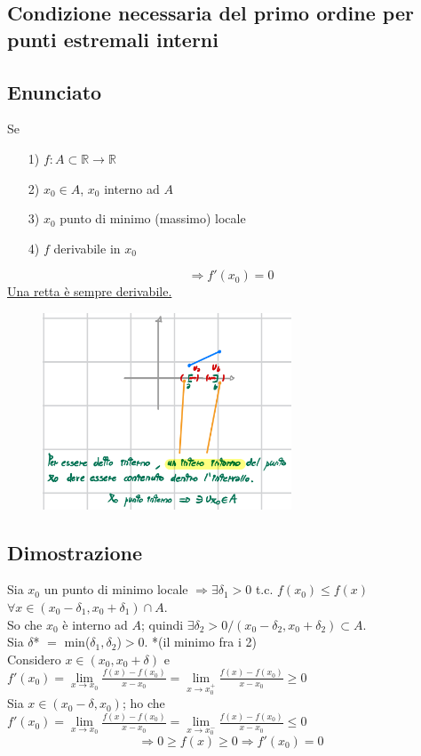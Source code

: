 \documentclass{article}
\newcommand{\R}{\mathbb{R}}
\newcommand{\hSpace}{\hspace{1em}}
\begin{document}
\begin{flushleft}
\section{Condizione necessaria del primo ordine per punti estremali interni}
\subsection{Enunciato}
Se
\begin{enumerate}
    \item[1)] $f: A \subset \R \rightarrow \R$
    \item[2)] $x_0 \in A$, $x_0$ interno ad $A$
    \item[3)] $x_0$ punto di minimo (massimo) locale
    \item[4)] $f$ derivabile in $x_0$   
\end{enumerate}
\[
\Rightarrow f'(x_0)=0
\]
\underline{Una retta è sempre derivabile.}
\begin{figure}[h]
    \centering
    \includegraphics[width=20em]{./images/condizione_necessaria_di_estremalita.jpeg}
\end{figure}
\FloatBarrier
\subsection{Dimostrazione}
Sia $x_0$ un punto di minimo locale $\Rightarrow \exists \delta_1 > 0$ t.c. $f(x_0) \leq f(x)$ $\forall x \in (x_0 - \delta_1, x_0 + \delta_1)\cap A$.\\
So che $x_0$ è interno ad $A$; quindi $\exists \delta_2 > 0 / (x_0 - \delta_2, x_0 + \delta_2) \subset A$.\\
Sia $\delta$* $=$ min($\delta_1, \delta_2$)$>0$. \hSpace *(il minimo fra i 2)\\
Considero $x \in (x_0, x_0 + \delta)$ e $f'(x_0) = \lim\limits_{x \to x_0}\frac{f(x) - f(x_0)}{x - x_0} = \lim\limits_{x \to x_0^+}\frac{f(x) - f(x_0)}{x - x_0} \geq 0$\\
Sia $x \in (x_0 - \delta, x_0)$; ho che $f'(x_0) = \lim\limits_{x \to x_0}\frac{f(x) - f(x_0)}{x - x_0} = \lim\limits_{x \to x_0^-}\frac{f(x) - f(x_0)}{x - x_0} \leq 0$
\[
\Rightarrow 0 \geq f(x) \geq 0 \Rightarrow f'(x_0)=0
\]


\end{flushleft}
\end{document}
